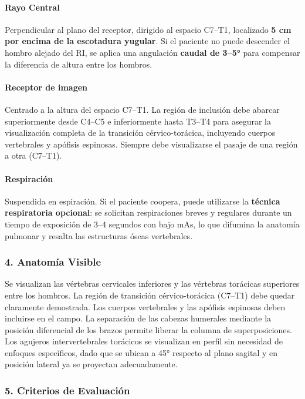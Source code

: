 		\paragraph{Rayo Central}
		Perpendicular al plano del receptor, dirigido al espacio C7--T1, localizado \textbf{5 cm por encima de la escotadura yugular}. Si el paciente no puede descender el hombro alejado del RI, se aplica una angulación \textbf{caudal de 3--5°} para compensar la diferencia de altura entre los hombros.
		
		\paragraph{Receptor de imagen}
		Centrado a la altura del espacio C7--T1. La región de inclusión debe abarcar superiormente desde C4--C5 e inferiormente hasta T3--T4 para asegurar la visualización completa de la transición cérvico-torácica, incluyendo cuerpos vertebrales y apófisis espinosas. Siempre debe visualizarse el pasaje de una región a otra (C7--T1).
		
		\paragraph{Respiración}
		Suspendida en espiración. Si el paciente coopera, puede utilizarse la \textbf{técnica respiratoria opcional}: se solicitan respiraciones breves y regulares durante un tiempo de exposición de 3--4 segundos con bajo mAs, lo que difumina la anatomía pulmonar y resalta las estructuras óseas vertebrales.
		
		\subsubsection*{4. Anatomía Visible}
		
		Se visualizan las vértebras cervicales inferiores y las vértebras torácicas superiores entre los hombros. La región de transición cérvico-torácica (C7--T1) debe quedar claramente demostrada. Los cuerpos vertebrales y las apófisis espinosas deben incluirse en el campo. La separación de las cabezas humerales mediante la posición diferencial de los brazos permite liberar la columna de superposiciones. Los agujeros intervertebrales torácicos se visualizan en perfil sin necesidad de enfoques específicos, dado que se ubican a 45° respecto al plano sagital y en posición lateral ya se proyectan adecuadamente.
		
		\subsubsection*{5. Criterios de Evaluación}
		
